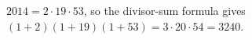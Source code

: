 $ 2014=2\cdot19\cdot53 $, so the divisor-sum formula gives $(1+2)(1+19)(1+53)=3\cdot20\cdot54=\boxed{3240}$.
